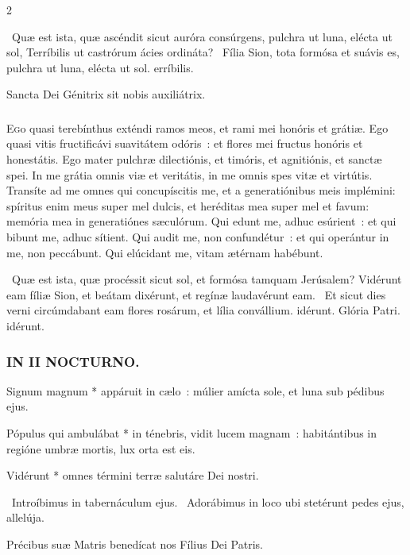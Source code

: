 \documentclass[9pt,twoside]{extarticle}
\begin{document}
\begin{multicols}{2}
\begin{tightlist}{}
\item {}~Quæ est ista, quæ ascéndit sicut auróra consúrgens, pulchra ut luna, elécta ut sol, \textred{*} Terríbilis ut castrórum ácies ordináta? 
~Fília Sion, tota formósa et suávis es, pulchra ut luna, elécta ut sol. erríbilis.
\item {\small {} Sancta Dei Génitrix sit nobis auxiliátrix.}
\end{tightlist}

\subsubsection*{\center {}}
\lettrine{E}go quasi terebínthus exténdi ramos meos, et rami mei honóris et grátiæ.
Ego quasi vitis fructificávi suavitátem odóris~: et flores mei fructus honóris et honestátis.
Ego mater pulchræ dilectiónis, et timóris, et agnitiónis, et sanctæ spei.
In me grátia omnis viæ et veritátis, in me omnis spes vitæ et virtútis.
Transíte ad me omnes qui concupíscitis me, et a generatiónibus meis implémini:
spíritus enim meus super mel dulcis, et heréditas mea super mel et favum:
memória mea in generatiónes sæculórum.
Qui edunt me, adhuc esúrient~: et qui bibunt me, adhuc sítient.
Qui audit me, non confundétur~: et qui operántur in me, non peccábunt.
Qui elúcidant me, vitam ætérnam habébunt.

\begin{tightlist}{}
\item {}~Quæ est ista, quæ procéssit sicut sol, et formósa tamquam Jerúsalem? \textred{*} Vidérunt eam fíliæ Sion, et beátam dixérunt, et regínæ laudavérunt eam. ~Et sicut dies verni circúmdabant eam flores rosárum, et lília convállium. idérunt. Glória Patri. idérunt.
\end{tightlist}

\subsubsection*{\center \textsc{IN II NOCTURNO.}}
\begin{tightlist}{}
\item {} Signum magnum * appáruit in cælo~: múlier amícta sole, et luna sub pédibus ejus.
\item {} Pópulus qui ambulábat * in ténebris, vidit lucem magnam~: habitántibus in regióne umbræ mortis, lux orta est eis.
\item {} Vidérunt * omnes términi terræ salutáre Dei nostri.
\item {}~Introíbimus in tabernáculum ejus. ~Adorábimus in loco ubi stetérunt pedes ejus, allelúja.
\item {\small {} Précibus suæ Matris benedícat nos Fílius Dei Patris.}
\end{tightlist}


\end{multicols}
\end{document}
